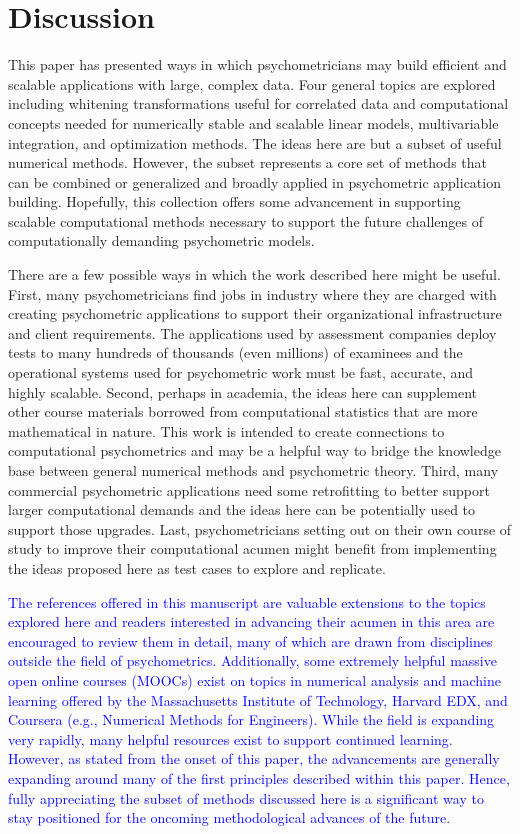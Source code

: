 \documentclass[12pt]{article}
\begin{document}
\section*{Discussion}

This paper has presented ways in which psychometricians may build efficient and scalable applications with large, complex data. Four general topics are explored including whitening transformations useful for correlated data and computational concepts needed for numerically stable and scalable linear models, multivariable integration, and optimization methods. The ideas here are but a subset of useful numerical methods. However, the subset represents a core set of methods that can be combined or generalized and broadly applied in psychometric application building. Hopefully, this collection offers some advancement in supporting scalable computational methods necessary to support the future challenges of computationally demanding psychometric models. 

There are a few possible ways in which the work described here might be useful. First, many psychometricians find jobs in industry where they are charged with creating psychometric applications to support their organizational infrastructure and client requirements. The applications used by assessment companies deploy tests to many hundreds of thousands (even millions) of examinees and the operational systems used for psychometric work must be fast, accurate, and highly scalable. Second, perhaps in academia, the ideas here can supplement other course materials borrowed from computational statistics that are more mathematical in nature. This work is intended to create connections to computational psychometrics and may be a helpful way to bridge the knowledge base between general numerical methods and psychometric theory. Third, many commercial psychometric applications need some retrofitting to better support larger computational demands and the ideas here can be potentially used to support those upgrades. Last, psychometricians setting out on their own course of study to improve their computational acumen might benefit from implementing the ideas proposed here as test cases to explore and replicate.

\textcolor{blue}{The references offered in this manuscript are valuable extensions to the topics explored here and readers interested in advancing their acumen in this area are encouraged to review them in detail, many of which are drawn from disciplines outside the field of psychometrics. Additionally, some extremely helpful massive open online courses (MOOCs) exist on topics in numerical analysis and machine learning offered by the Massachusetts Institute of Technology, Harvard EDX, and Coursera (e.g., Numerical Methods for Engineers). While the field is expanding very rapidly, many helpful resources exist to support continued learning. However, as stated from the onset of this paper, the advancements are generally expanding around many of the first principles described within this paper. Hence, fully appreciating the subset of methods discussed here is a significant way to stay positioned for the oncoming methodological advances of the future.}
\end{document}
